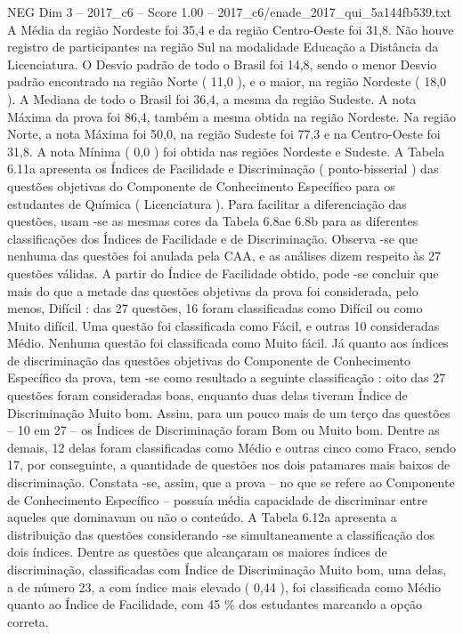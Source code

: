 \begin{textsample}{NEG Dim 3 – 2017\_c6 – Score 1.00 – 2017\_c6/enade\_2017\_qui\_5a144fb539.txt}
A Média da região Nordeste foi 35,4 e da região Centro-Oeste foi 31,8.
Não houve registro de participantes na região Sul na modalidade Educação a Distância da Licenciatura.
O Desvio padrão de todo o Brasil foi 14,8, sendo o menor Desvio padrão encontrado na região Norte ( 11,0 ), e o maior, na região Nordeste ( 18,0 ).
A Mediana de todo o Brasil foi 36,4, a mesma da região Sudeste.
A nota Máxima da prova foi 86,4, também a mesma obtida na região Nordeste.
Na região Norte, a nota Máxima foi 50,0, na região Sudeste foi 77,3 e na Centro-Oeste foi 31,8.
A nota Mínima ( 0,0 ) foi obtida nas regiões Nordeste e Sudeste.
A Tabela 6.11a apresenta os Índices de Facilidade e Discriminação ( ponto-bisserial ) das questões objetivas do Componente de Conhecimento Específico para os estudantes de Química ( Licenciatura ).
Para facilitar a diferenciação das questões, usam -se as mesmas cores da Tabela 6.8ae 6.8b para as diferentes classificações dos Índices de Facilidade e de Discriminação.
Observa -se que nenhuma das questões foi anulada pela CAA, e as análises dizem respeito às 27 questões válidas.
A partir do Índice de Facilidade obtido, pode -se concluir que mais do que a metade das questões objetivas da prova foi considerada, pelo menos, Difícil : das 27 questões, 16 foram classificadas como Difícil ou como Muito difícil.
Uma questão foi classificada como Fácil, e outras 10 consideradas Médio.
Nenhuma questão foi classificada como Muito fácil.
Já quanto aos índices de discriminação das questões objetivas do Componente de Conhecimento Específico da prova, tem -se como resultado a seguinte classificação : oito das 27 questões foram consideradas boas, enquanto duas delas tiveram Índice de Discriminação Muito bom.
Assim, para um pouco mais de um terço das questões – 10 em 27 – os Índices de Discriminação foram Bom ou Muito bom.
Dentre as demais, 12 delas foram classificadas como Médio e outras cinco como Fraco, sendo 17, por conseguinte, a quantidade de questões nos dois patamares mais baixos de discriminação.
Constata -se, assim, que a prova – no que se refere ao Componente de Conhecimento Específico – possuía média capacidade de discriminar entre aqueles que dominavam ou não o conteúdo.
A Tabela 6.12a apresenta a distribuição das questões considerando -se simultaneamente a classificação dos dois índices.
Dentre as questões que alcançaram os maiores índices de discriminação, classificadas com Índice de Discriminação Muito bom, uma delas, a de número 23, a com índice mais elevado ( 0,44 ), foi classificada como Médio quanto ao Índice de Facilidade, com 45 \% dos estudantes marcando a opção correta.

\end{textsample}
